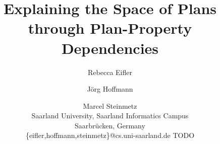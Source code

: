 \documentclass[letterpaper]{article}
\begin{document}
\nocopyright

\title{Explaining the Space of Plans through Plan-Property Dependencies}

\author{
\hspace{3.0cm}Rebecca Eifler \and J\"org Hoffmann \and Marcel Steinmetz\\
  \hspace{3.0cm}Saarland University, Saarland Informatics Campus\\
  \hspace{3.0cm}Saarbr\"ucken, Germany\\
  \hspace{3.0cm}\{eifler,hoffmann,steinmetz\}@cs.uni-saarland.de
\And
\hspace{4.0cm} TODO
}

\maketitle

\begin{abstract}
\end{abstract}













\medskip

\noindent

%
%
\end{document}
